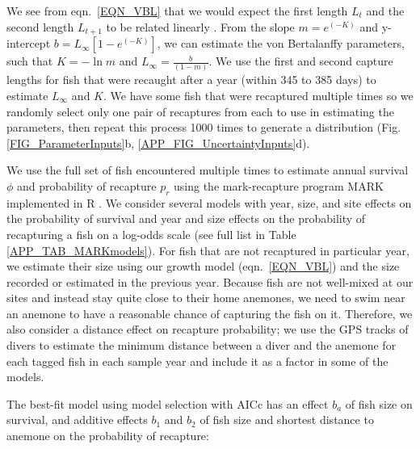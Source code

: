 \documentclass[12pt, oneside]{article}   	%
\begin{document}
We see from eqn.\ \ref{EQN_VBL} that we would expect the first length $L_t$ and the second length $L_{t+1}$ to be related linearly \citep{hart2009estimating}. From the slope $m = e^{(-K)}$ and y-intercept $b =  L_\infty[1 - e^{(-K)}]$, we can estimate the von Bertalanffy parameters, such that $K = -\ln m$ and $L_\infty = \frac{b}{(1-m)}$. We use the first and second capture lengths for fish that were recaught after a year (within 345 to 385 days) to estimate $L_\infty$ and $K$. We have some fish that were recaptured multiple times so we randomly select only one pair of recaptures from each to use in estimating the parameters, then repeat this process 1000 times to generate a distribution (Fig. \ref{FIG_ParameterInputs}b, \ref{APP_FIG_UncertaintyInputs}d). 

We use the full set of fish encountered multiple times to estimate annual survival $\phi$ and probability of recapture $p_r$ using the mark-recapture program MARK implemented in R \citep{RMark_Laake2013}. We consider several models with year, size, and site effects on the probability of survival and year and size effects on the probability of recapturing a fish on a log-odds scale (see full list in Table \ref{APP_TAB_MARKmodels}). For fish that are not recaptured in particular year, we estimate their size using our growth model (eqn.\ \ref{EQN_VBL}) and the size recorded or estimated in the previous year. Because fish are not well-mixed at our sites and instead stay quite close to their home anemones, we need to swim near an anemone to have a reasonable chance of capturing the fish on it. Therefore, we also consider a distance effect on recapture probability; we use the GPS tracks of divers to estimate the minimum distance between a diver and the anemone for each tagged fish in each sample year and include it as a factor in some of the models.

The best-fit model using model selection with AICc has an effect $b_a$ of fish size on survival, and additive effects $b_1$ and $b_2$ of fish size and shortest distance to anemone on the probability of recapture:

\end{document}
